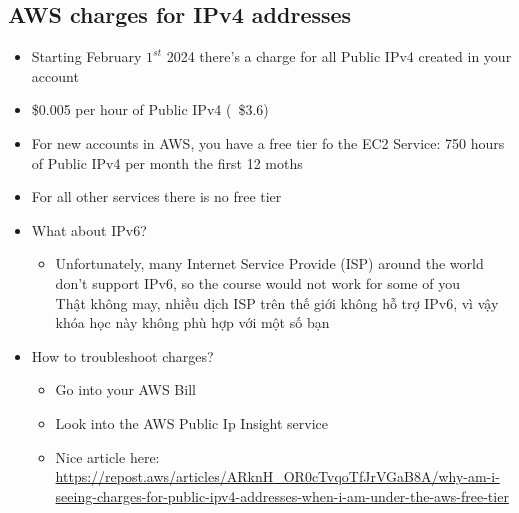 \subsection{AWS charges for IPv4 addresses}

\begin{itemize}
	\item Starting February $1^{st}$ 2024 there's a charge for all Public IPv4 created in your account
	\item \$0.005 per hour of Public IPv4 (~\$3.6) 
	\item For new accounts in AWS, you have a free tier fo the EC2 Service: 750 hours of Public IPv4 per month the first 12 moths
	\item For all other services there is no free tier
	\item What about IPv6?
	\begin{itemize}
		\item Unfortunately, many Internet Service Provide (ISP) around the world don't support IPv6, so the course would not work for some of you \\ Thật không may, nhiều dịch ISP trên thế giới không hỗ trợ IPv6, vì vậy khóa học này không phù hợp với một số bạn
	\end{itemize}
	\item How to troubleshoot charges?
	\begin{itemize}
		\item Go into your AWS Bill
		\item Look into the AWS Public Ip Insight service
		\item Nice article here:
		\url{https://repost.aws/articles/ARknH_OR0cTvqoTfJrVGaB8A/why-am-i-seeing-charges-for-public-ipv4-addresses-when-i-am-under-the-aws-free-tier}
	\end{itemize}
\end{itemize}

